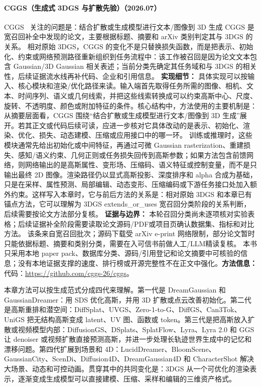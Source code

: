 \paragraph{CGGS（生成式 3DGS 与扩散先验）（2026.07）}
CGGS~\cite{2607_03819} 关注的问题是：结合扩散或生成模型进行文本/图像到 3D 生成 CGGS 是宽召回补全中发现的论文，主要根据标题、摘要和 arXiv 类别判定其与 3DGS 的关系。
相对原始 3DGS，CGGS 的变化不是只替换损失函数，而是把表示、初始化、约束或网络预测路径重新组织到任务流程中：该工作被召回是因为论文文本包含 Gaussian/3D Gaussian 相关表述；当前分类先确定其任务域和与 3DGS 的相关性，后续证据流水线再补代码、企业和引用信息。
\textbf{实现细节：} 具体实现可以按输入、核心模块和渲染/优化路径来读。输入端首先取得任务所需的图像、相机、文本、时间序列、语义或几何线索，并把这些线索转换成可以约束高斯中心、尺度、旋转、不透明度、颜色或附加特征的条件。核心结构中，方法使用的主要机制是：从摘要层面看，CGGS 围绕“结合扩散或生成模型进行文本/图像到 3D 生成”展开。若其正文或代码后续可读，应进一步核对它具体改动的是表示、初始化、渲染、优化、损失、动态建模、压缩或应用接口中的哪一环。 训练或推理时，这些模块通常先给出初始化或中间特征，再通过可微 Gaussian rasterization、重建损失、感知/语义约束、几何正则或任务损失回传到高斯参数；如果方法包含前馈网络，则网络输出的是高斯属性、变形场、压缩码、语义特征或控制变量，而不是只输出最终 2D 图像。渲染路径仍以显式高斯投影、深度排序和 alpha 合成为基础，只是在采样、属性预测、局部编辑、动态变形、压缩编码或下游任务接口处加入额外约束。这样写入本章时，它与前后方法的关系是：相对原始 3DGS 和本章已有锚点方法，它可以理解为 3DGS extends\_or\_uses 宽召回分类阶段的关系判断，后续需要按论文方法部分复核。
\textbf{证据与边界：} 本轮召回分类尚未逐项核对实验表格；后续证据补全阶段需要读取论文源码/PDF或项目页确认数据集、指标和对比方法。 该条来自宽召回批次；源码下载受 arXiv e-print 网络限制，部分论文暂时只能依据标题、摘要和类别分类，需要在入可信书前做人工/LLM精读复核。 本书只采用本地 paper pack、数据库分类、源码/引用登记和论文摘要中可核验的信息；没有本地证据支撑的速度、排行榜或开源完整性不在正文中强化。\textbf{方法信息：} 代码：\url{https://github.com/cggs-26/cggs}。


本章方法可以按生成范式分成四代来理解。第一代是 DreamGaussian 和 GaussianDreamer：用 SDS 优化高斯，并用 3D 扩散或点云改善初始化。第二代是高斯重排和潜空间：DiffSplat、UVGS、Zero-1-to-G、DiffGS、Can3Tok、UniGS 把无结构高斯变成 latent、UV 图、函数或 token。第三代是把高斯放入扩散或视频模型内部：DiffusionGS、DSplats、SplatFlow、Lyra、Lyra 2.0 和 GGS 让 denoiser 或视频扩散直接预测高斯，并进一步处理长轨迹世界生成中的记忆和漂移问题。第四代扩展到场景和 4D：LucidDreamer、BloomScene、GaussianCity、ScenDi、Diffusion4D、DreamGaussian4D 和 CharacterShot 解决大场景、动态和可控动画。贯穿其中的共同变化是：3DGS 从一个可优化的渲染表示，逐渐变成生成模型可以直接建模、压缩、采样和编辑的三维资产格式。

